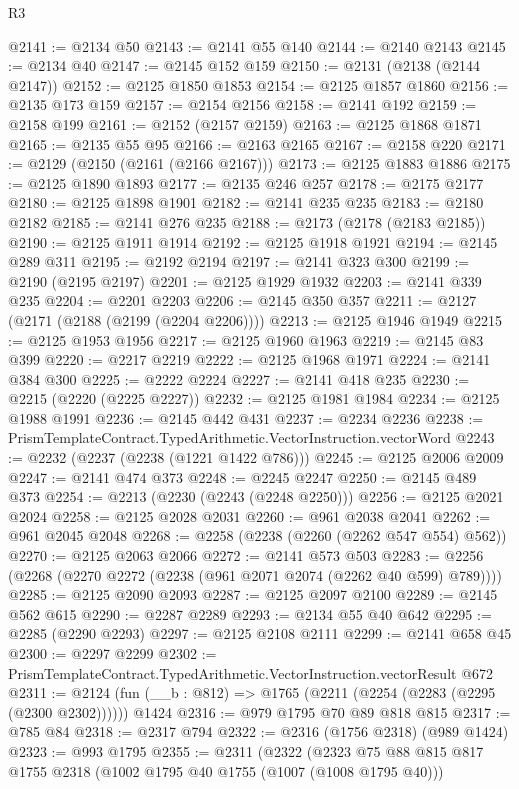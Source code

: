 \begin{lexlean}{R3}
\begin{coremodule}
@2141 := @2134 @50
@2143 := @2141 @55 @140
@2144 := @2140 @2143
@2145 := @2134 @40
@2147 := @2145 @152 @159
@2150 := @2131 (@2138 (@2144 @2147))
@2152 := @2125 @1850 @1853
@2154 := @2125 @1857 @1860
@2156 := @2135 @173 @159
@2157 := @2154 @2156
@2158 := @2141 @192
@2159 := @2158 @199
@2161 := @2152 (@2157 @2159)
@2163 := @2125 @1868 @1871
@2165 := @2135 @55 @95
@2166 := @2163 @2165
@2167 := @2158 @220
@2171 := @2129 (@2150 (@2161 (@2166 @2167)))
@2173 := @2125 @1883 @1886
@2175 := @2125 @1890 @1893
@2177 := @2135 @246 @257
@2178 := @2175 @2177
@2180 := @2125 @1898 @1901
@2182 := @2141 @235 @235
@2183 := @2180 @2182
@2185 := @2141 @276 @235
@2188 := @2173 (@2178 (@2183 @2185))
@2190 := @2125 @1911 @1914
@2192 := @2125 @1918 @1921
@2194 := @2145 @289 @311
@2195 := @2192 @2194
@2197 := @2141 @323 @300
@2199 := @2190 (@2195 @2197)
@2201 := @2125 @1929 @1932
@2203 := @2141 @339 @235
@2204 := @2201 @2203
@2206 := @2145 @350 @357
@2211 := @2127 (@2171 (@2188 (@2199 (@2204 @2206))))
@2213 := @2125 @1946 @1949
@2215 := @2125 @1953 @1956
@2217 := @2125 @1960 @1963
@2219 := @2145 @83 @399
@2220 := @2217 @2219
@2222 := @2125 @1968 @1971
@2224 := @2141 @384 @300
@2225 := @2222 @2224
@2227 := @2141 @418 @235
@2230 := @2215 (@2220 (@2225 @2227))
@2232 := @2125 @1981 @1984
@2234 := @2125 @1988 @1991
@2236 := @2145 @442 @431
@2237 := @2234 @2236
@2238 := PrismTemplateContract.TypedArithmetic.VectorInstruction.vectorWord
@2243 := @2232 (@2237 (@2238 (@1221 @1422 @786)))
@2245 := @2125 @2006 @2009
@2247 := @2141 @474 @373
@2248 := @2245 @2247
@2250 := @2145 @489 @373
@2254 := @2213 (@2230 (@2243 (@2248 @2250)))
@2256 := @2125 @2021 @2024
@2258 := @2125 @2028 @2031
@2260 := @961 @2038 @2041
@2262 := @961 @2045 @2048
@2268 := @2258 (@2238 (@2260 (@2262 @547 @554) @562))
@2270 := @2125 @2063 @2066
@2272 := @2141 @573 @503
@2283 := @2256 (@2268 (@2270 @2272 (@2238 (@961 @2071 @2074 (@2262 @40 @599) @789))))
@2285 := @2125 @2090 @2093
@2287 := @2125 @2097 @2100
@2289 := @2145 @562 @615
@2290 := @2287 @2289
@2293 := @2134 @55 @40 @642
@2295 := @2285 (@2290 @2293)
@2297 := @2125 @2108 @2111
@2299 := @2141 @658 @45
@2300 := @2297 @2299
@2302 := PrismTemplateContract.TypedArithmetic.VectorInstruction.vectorResult @672
@2311 := @2124 (fun (__b : @812) => @1765 (@2211 (@2254 (@2283 (@2295 (@2300 @2302)))))) @1424
@2316 := @979 @1795 @70 @89 @818 @815
@2317 := @785 @84
@2318 := @2317 @794
@2322 := @2316 (@1756 @2318) (@989 @1424)
@2323 := @993 @1795
@2355 := @2311
    (@2322
      (@2323
        @75
        @88
        @815
        @817
        @1755
        @2318
        (@1002 @1795 @40 @1755 (@1007 (@1008 @1795 @40)))

\end{coremodule}
\end{lexlean}

